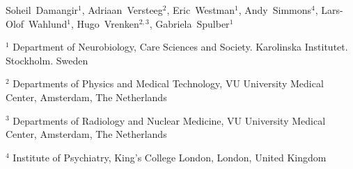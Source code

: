 Soheil~Damangir$^1$, 
Adriaan~Versteeg$^2$, 
Eric~Westman$^1$, 
Andy~Simmons$^4$, 
Lars-Olof~Wahlund$^1$, 
Hugo~Vrenken$^{2,3}$, 
Gabriela~Spulber$^1$

$^1$ Department of Neurobiology, Care Sciences and Society. Karolinska Institutet. Stockholm. Sweden

$^2$ Departments of Physics and Medical Technology, VU University Medical Center, Amsterdam, The Netherlands

$^3$ Departments of Radiology and Nuclear Medicine, VU University Medical Center, Amsterdam, The Netherlands

$^4$ Institute of Psychiatry, King's College London, London, United Kingdom
  
  
  
  
  
  
  